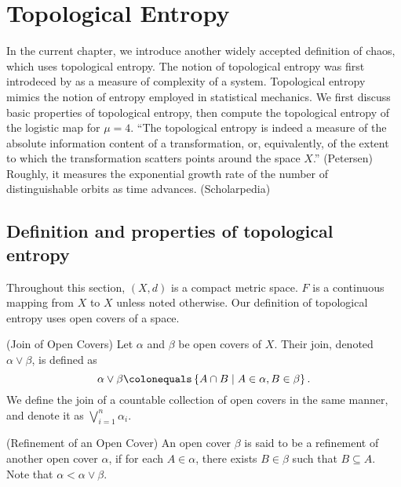 \documentclass[12pt,twoside,draft]{book}
\begin{document}
\chapter{Topological Entropy}
In the current chapter, we introduce another widely accepted definition of chaos, which uses topological entropy.
The notion of topological entropy was first introdeced by \citet{akm} as a measure of complexity of a system.
Topological entropy mimics the notion of entropy employed in statistical mechanics.
We first discuss basic properties of topological entropy, then compute the topological entropy of the logistic map for $\mu = 4$.
``The topological entropy is indeed a measure of the absolute information content of a transformation, or, equivalently, of the extent to which the transformation scatters points around the space $X$.'' (Petersen)
Roughly, it measures the exponential growth rate of the number of distinguishable orbits as time advances. (Scholarpedia)

\section{Definition and properties of topological entropy}
Throughout this section, $(X,d)$ is a compact metric space.
$F$ is a continuous mapping from $X$ to $X$ unless noted otherwise.
Our definition of topological entropy uses open covers of a space. 

\begin{definition}
  (Join of Open Covers)
  Let $\alpha$ and $\beta$ be open covers of $X$.
  Their join, denoted $\alpha \vee \beta$, is defined as
  \begin{equation*}
    \alpha \vee \beta \ceq \setst{A \cap B}{A \in \alpha, B \in \beta}.
  \end{equation*}
  We define the join of a countable collection of open covers in the same manner, and denote it as $\bigvee\limits_{i = 1}^{n} \alpha_i$.
\end{definition}

\begin{definition}
  (Refinement of an Open Cover)
  An open cover $\beta$ is said to be a refinement of another open cover $\alpha$, if for each $A \in \alpha$, there exists $B \in \beta$ such that $B \subseteq A$.
  Note that $\alpha < \alpha \vee \beta$.
\end{definition}
\end{document}
